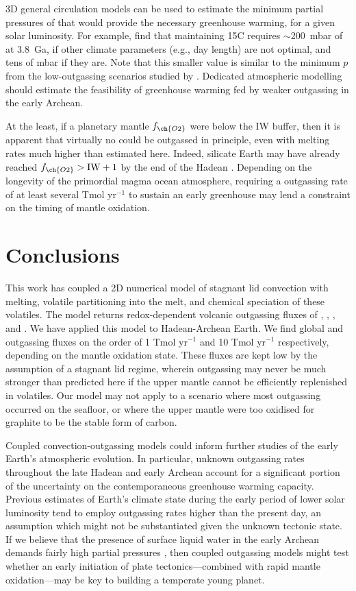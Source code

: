 3D general circulation models can be used to estimate the minimum partial pressures of  that would provide the necessary greenhouse warming, for a given solar luminosity. For example, \citet{Wolf2014} find that maintaining 15\degree C requires $\sim$200~mbar of  at 3.8~Ga, if other climate parameters (e.g., day length) are not optimal, and tens of mbar if they are. Note that this smaller value is similar to the minimum $p$ from the low-outgassing scenarios studied by \citet{KT2018}. Dedicated atmospheric modelling should estimate the feasibility of greenhouse warming fed by weaker outgassing in the early Archean. 

At the least, if a planetary mantle $f_{\ch{O2}}$ were below the IW buffer, then it is apparent that virtually no  could be outgassed in principle, even with melting rates much higher than estimated here. Indeed, silicate Earth may have already reached $f_{\ch{O2}} > {\rm IW} + 1$ by the end of the Hadean \citep{Pahlevan2019}. Depending on the longevity of the primordial magma ocean atmosphere, requiring a  outgassing rate of at least several Tmol yr$^{-1}$ to sustain an early greenhouse may lend a constraint on the timing of mantle oxidation.


\section{Conclusions}

This work has coupled a 2D numerical model of stagnant lid convection with melting, volatile partitioning into the melt, and chemical speciation of these volatiles. The model returns redox-dependent volcanic outgassing fluxes of , , , and . We have applied this model to Hadean-Archean Earth. We find global  and  outgassing fluxes on the order of 1 Tmol yr$^{-1}$ and 10 Tmol yr$^{-1}$ respectively, depending on the mantle oxidation state. These fluxes are kept low by the assumption of a stagnant lid regime, wherein outgassing may never be much stronger than predicted here if the upper mantle cannot be efficiently replenished in volatiles. Our model may not apply to a scenario where most outgassing occurred on the seafloor, or where the upper mantle were too oxidised for graphite to be the stable form of carbon.


Coupled convection-outgassing models could inform further studies of the early Earth's atmospheric evolution. In particular, unknown  outgassing rates throughout the late Hadean and early Archean account for a significant portion of the uncertainty on the contemporaneous greenhouse warming capacity. Previous estimates of Earth's climate state during the early period of lower solar luminosity tend to employ outgassing rates higher than the present day, an assumption which might not be substantiated given the unknown tectonic state. If we believe that the presence of surface liquid water in the early Archean demands fairly high  partial pressures \citep{charnay2020}, then coupled outgassing models might test whether an early initiation of plate tectonics---combined with rapid mantle oxidation---may be key to building a temperate young planet.



